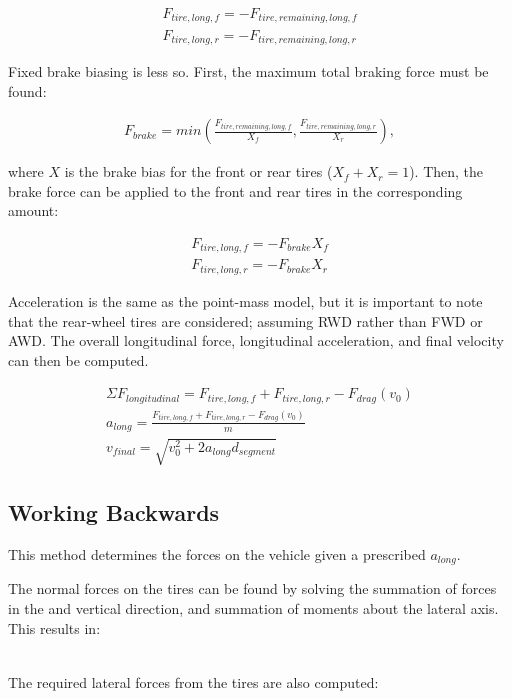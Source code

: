 \documentclass{article}
\begin{document}
\begin{align}
	F_{tire,long,f} = -F_{tire,remaining,long,f} \\
	F_{tire,long,r} = -F_{tire,remaining,long,r}
\end{align}

Fixed brake biasing is less so. First, the maximum total braking force must be found:

\begin{align}
	F_{brake} = min(\frac{F_{tire,remaining,long,f}}{X_{f}}, \frac{F_{tire,remaining,long,r}}{X_{r}}),
\end{align}

where $X$ is the brake bias for the front or rear tires ($X_f + X_r = 1$). Then, the brake force can be applied to the front and rear tires in the corresponding amount:

\begin{align}
	F_{tire,long,f} = - F_{brake} X_{f} \\
	F_{tire,long,r} = - F_{brake} X_{r}
\end{align}

Acceleration is the same as the point-mass model, but it is important to note that the rear-wheel tires are considered; assuming RWD rather than FWD or AWD. The overall longitudinal force, longitudinal acceleration, and final velocity can then be computed.

\begin{align}
	\Sigma F_{longitudinal} = F_{tire,long,f} + F_{tire,long,r} - F_{drag}(v_0) \\
	a_{long} = \frac{ F_{tire,long,f} + F_{tire,long,r} - F_{drag}(v_0)}{m} \\
	v_{final} = \sqrt{v_0^2 + 2 a_{long} d_{segment}}
\end{align}

\subsection{Working Backwards}
This method determines the forces on the vehicle given a prescribed $a_{long}$.

The normal forces on the tires can be found by solving the summation of forces in the and vertical direction, and summation of moments about the lateral axis. This results in:

\begin{align}
\end{align}

The required lateral forces from the tires are also computed:
\end{document}
